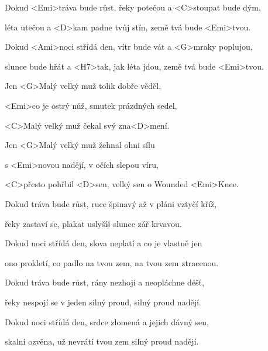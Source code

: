 

\zs
Dokud <Emi>tráva bude růst,
řeky potečou a <C>stoupat bude dým,

léta utečou a <D>kam padne tvůj stín,
země tvá bude <Emi>tvou.

Dokud <Ami>noci střídá den,
vítr bude vát a <G>mraky poplujou,

slunce bude hřát a <H7>tak, jak léta jdou,
země tvá bude <Emi>tvou.
\ks

\zr
Jen <G>Malý velký muž tolik dobře věděl,

<Emi>co je ostrý nůž, smutek prázdných sedel,

<C>Malý velký muž čekal svý zna<D>mení.

Jen <G>Malý velký muž žehnal ohni sílu

s <Emi>novou nadějí, v očích slepou víru,

<C>přesto pohřbil <D>sen, velký sen o Wounded <Emi>Knee.
\kr

\zs
Dokud tráva bude růst,
ruce špinavý až v pláni vztyčí kříž,

řeky zastaví se, plakat uslyšíš
slunce zář krvavou.

Dokud noci střídá den,
slova neplatí a co je vlastně jen

ono prokletí, co padlo na tvou zem,
na tvou zem ztracenou.
\ks

\zr \kr

\zs
Dokud tráva bude růst,
rány nezhojí a neopláchne déšť,

řeky nespojí se v jeden silný proud,
silný proud nadějí.

Dokud noci střídá den,
srdce zlomená a jejich dávný sen,

skalní ozvěna, už nevrátí tvou zem
silný proud nadějí.
\ks

\zr \kr

\kp
